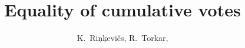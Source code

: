 
\title{Equality of cumulative votes}

\author{K.~Ri{\c n}{\c k}evi{\v c}s,
R.~Torkar,\corrauth}

\address{Blekinge Institute of Technology, Karlskrona, Sweden\break
{}Certus Software V\&V Center, Simula Research Laboratory, Oslo, Norway}


\begin{abstract}

\end{abstract}


\maketitle
